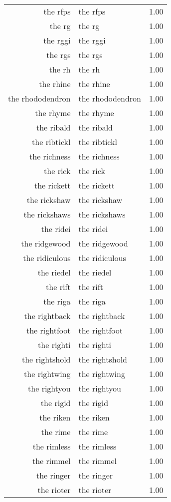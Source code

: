 \begin{table}[ht]
\begin{tabular}{rlr}
  the rfps & the rfps & 1.00 \\ 
  the rg & the rg & 1.00 \\ 
  the rggi & the rggi & 1.00 \\ 
  the rgs & the rgs & 1.00 \\ 
  the rh & the rh & 1.00 \\ 
  the rhine & the rhine & 1.00 \\ 
  the rhododendron & the rhododendron & 1.00 \\ 
  the rhyme & the rhyme & 1.00 \\ 
  the ribald & the ribald & 1.00 \\ 
  the ribtickl & the ribtickl & 1.00 \\ 
  the richness & the richness & 1.00 \\ 
  the rick & the rick & 1.00 \\ 
  the rickett & the rickett & 1.00 \\ 
  the rickshaw & the rickshaw & 1.00 \\ 
  the rickshaws & the rickshaws & 1.00 \\ 
  the ridei & the ridei & 1.00 \\ 
  the ridgewood & the ridgewood & 1.00 \\ 
  the ridiculous & the ridiculous & 1.00 \\ 
  the riedel & the riedel & 1.00 \\ 
  the rift & the rift & 1.00 \\ 
  the riga & the riga & 1.00 \\ 
  the rightback & the rightback & 1.00 \\ 
  the rightfoot & the rightfoot & 1.00 \\ 
  the righti & the righti & 1.00 \\ 
  the rightshold & the rightshold & 1.00 \\ 
  the rightwing & the rightwing & 1.00 \\ 
  the rightyou & the rightyou & 1.00 \\ 
  the rigid & the rigid & 1.00 \\ 
  the riken & the riken & 1.00 \\ 
  the rime & the rime & 1.00 \\ 
  the rimless & the rimless & 1.00 \\ 
  the rimmel & the rimmel & 1.00 \\ 
  the ringer & the ringer & 1.00 \\ 
  the rioter & the rioter & 1.00 \\ 

\end{tabular}
\end{table}
